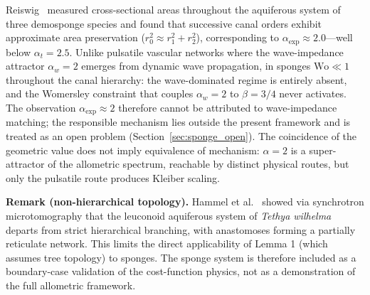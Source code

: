 \documentclass[11pt,a4paper]{article}
\theoremstyle{remark}
\begin{document}
Reiswig~\cite{reiswig1975} measured cross-sectional areas throughout the
aquiferous system of three demosponge species and found that successive canal
orders exhibit approximate area preservation ($r_0^2 \approx r_1^2 + r_2^2$),
corresponding to $\alpha_{\exp} \approx 2.0$---well below $\alpha_t = 2.5$.
Unlike pulsatile vascular networks where the wave-impedance attractor $\alpha_w
= 2$ emerges from dynamic wave propagation, in sponges $\mathrm{Wo} \ll 1$
throughout the canal hierarchy: the wave-dominated regime is entirely absent,
and the Womersley constraint that couples $\alpha_w = 2$ to $\beta = 3/4$ never
activates. The observation $\alpha_{\exp} \approx 2$ therefore cannot be
attributed to wave-impedance matching; the responsible mechanism lies outside
the present framework and is treated as an open problem
(Section~\ref{sec:sponge_open}). The coincidence of the geometric value does
not imply equivalence of mechanism: $\alpha = 2$ is a super-attractor of the
allometric spectrum, reachable by distinct physical routes, but only the
pulsatile route produces Kleiber scaling.

\noindent\textbf{Remark (non-hierarchical topology).} Hammel et al.~\cite{hammel2012} showed
via synchrotron microtomography that the leuconoid aquiferous system of \emph{Tethya wilhelma}
departs from strict hierarchical branching, with anastomoses forming a partially reticulate network.
This limits the direct applicability of Lemma 1 (which assumes tree topology) to sponges.
The sponge system is therefore included as a boundary-case validation of the cost-function physics,
not as a demonstration of the full allometric framework.
\end{document}
